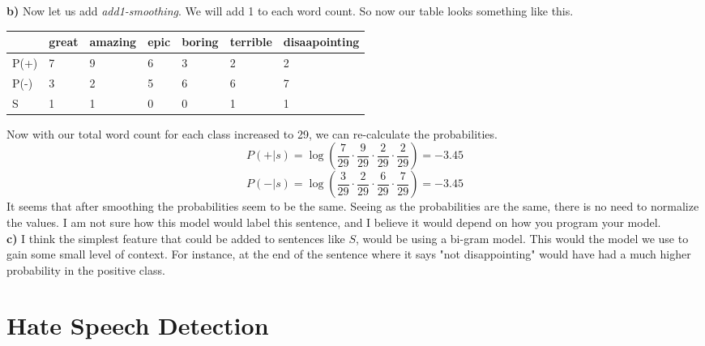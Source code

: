 \documentclass[12pt]{article}
\begin{document}
\textbf{b)} Now let us add \textit{add1-smoothing}. We will add 1 to each word count. So now our table looks something like this.
\begin{table}[!h]
\centering
\begin{tabular}{|l|l|l|l|l|l|l|}
\hline
     & great & amazing & epic & boring & terrible & disaapointing \\ \hline
P(+) & 7     & 9       & 6    & 3      & 2        & 2             \\ \hline
P(-) & 3     & 2       & 5    & 6      & 6        & 7             \\ \hline
S    & 1     & 1       & 0    & 0      & 1        & 1             \\ \hline
\end{tabular}
\end{table}
Now with our total word count for each class increased to 29, we can re-calculate the probabilities.
\[ P(+|s) = \log \left(\dfrac{7}{29} \cdot \dfrac{9}{29} \cdot \dfrac{2}{29} \cdot \dfrac{2}{29}\right) = -3.45 \]
\[ P(-|s) = \log \left(\dfrac{3}{29} \cdot \dfrac{2}{29} \cdot \dfrac{6}{29} \cdot \dfrac{7}{29}\right) = -3.45 \]
It seems that after smoothing the probabilities seem to be the same. Seeing as the probabilities are the same, there is no need to normalize the values. I am not sure how this model would label this sentence, and I believe it would depend on how you program your model.\\

\textbf{c)} I think the simplest feature that could be added to sentences like $S$, would be using a bi-gram model. This would the model we use to gain some small level of context. For instance, at the end of the sentence where it says "not disappointing" would have had a much higher probability in the positive class.
\section{Hate Speech Detection}
\end{document}
